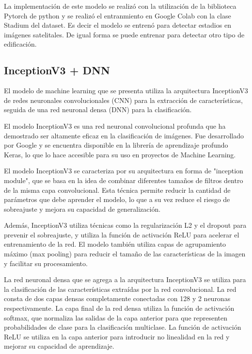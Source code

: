 \documentclass[article]{llncs}
\begin{document}
La implementaci\'on de este modelo se realiz\'o con la utilizaci\'on de la biblioteca Pytorch de python y se realiz\'o el
entranmiento en Google Colab con la clase Stadium del dataset. Es decir el modelo se entren\'o para detectar estadios en 
im\'agenes satelitales. De igual forma se puede entrenar para detectar otro tipo de edificaci\'on.

\subsection{InceptionV3 + DNN}

El modelo de machine learning que se presenta utiliza la arquitectura InceptionV3 de redes neuronales convolucionales 
(CNN) para la extracción de características, seguida de una red neuronal densa (DNN) para la clasificación.

El modelo InceptionV3 es una red neuronal convolucional profunda que ha demostrado ser altamente eficaz en la 
clasificación de imágenes. Fue desarrollado por Google y se encuentra disponible en la librería de aprendizaje profundo 
Keras, lo que lo hace accesible para su uso en proyectos de Machine Learning.

El modelo InceptionV3 se caracteriza por su arquitectura en forma de "inception module", que se basa en la idea de 
combinar diferentes tamaños de filtros dentro de la misma capa convolucional. Esta técnica permite reducir la cantidad 
de parámetros que debe aprender el modelo, lo que a su vez reduce el riesgo de sobreajuste y mejora su capacidad de 
generalización.

Además, InceptionV3 utiliza técnicas como la regularización L2 y el dropout para prevenir el sobreajuste, y utiliza la 
función de activación ReLU para acelerar el entrenamiento de la red. El modelo también utiliza capas de agrupamiento 
máximo (max pooling) para reducir el tamaño de las características de la imagen y facilitar su procesamiento.

La red neuronal densa que se agrega a la arquitectura InceptionV3 se utiliza para la clasificación de las características 
extraídas por la red convolucional. La red consta de dos capas densas completamente conectadas con 128 y 2 neuronas respectivamente. 
La capa final de la red densa utiliza la función de activación softmax, que normaliza 
las salidas de la capa anterior para que representen probabilidades de clase para la clasificación multiclase. La función 
de activación ReLU se utiliza en la capa anterior para introducir no linealidad en la red y mejorar su capacidad de 
aprendizaje.
\end{document}
